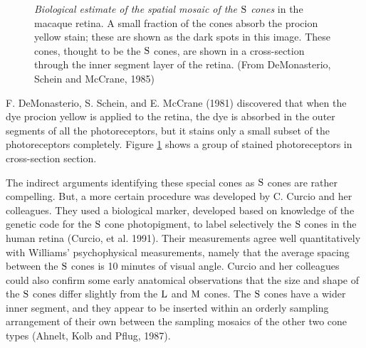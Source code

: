 \begin{figure}
\centerline{
}
\caption[Short-Wavelength Cone Mosaic:  Procion Yellow Stains]{
{\em Biological estimate of the spatial mosaic 
of the $\mbox{S}$ cones} in the macaque retina.
A small fraction of the cones absorb
the procion yellow stain;  these are shown as the
dark spots in this image.
These cones, thought to be the $\mbox{S}$ cones, 
are shown in a cross-section
through the inner segment layer of the retina.
(From DeMonasterio, Schein and McCrane, 1985)
}
\label{f2:blueConeMosaic}
\end{figure}
F. DeMonasterio, S. Schein, and E. McCrane (1981)
discovered that when the dye procion yellow
is applied to the retina, the dye is absorbed in the outer
segments of all the photoreceptors, but it stains only
a small subset of the photoreceptors completely.
Figure \ref{f2:blueConeMosaic} shows
a group of stained photoreceptors in cross-section section.
\nocite{deMonasterioScheinMcCrane}

The indirect arguments identifying these special cones
as $\mbox{S}$ cones are rather compelling.
But, a more certain procedure was developed
by C. Curcio and her colleagues.
They used a biological marker, developed based on knowledge
of the genetic code for the $\mbox{S}$ cone photopigment,
to label selectively the $\mbox{S}$ cones in the human retina
(Curcio, et al. 1991).
Their measurements agree well quantitatively with Williams'
psychophysical measurements, namely that the average spacing between
the $\mbox{S}$ cones is 10 minutes of visual angle.
Curcio and her colleagues could also
confirm some early anatomical observations that the
size and shape of the $\mbox{S}$ cones differ slightly from the $\mbox{L}$
and $\mbox{M}$ cones.
The $\mbox{S}$ cones have a wider inner segment,
and they appear to be
inserted within an orderly sampling arrangement of their
own between the sampling mosaics of the other two
cone types (Ahnelt, Kolb and Pflug, 1987).

